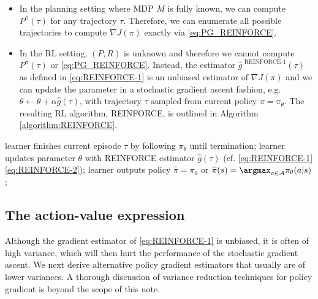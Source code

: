\begin{itemize}
    \item In the planning setting where MDP $M$ is fully known, we can compute $P^\pi(\tau)$ for any trajectory $\tau$.
    Therefore, we can enumerate all possible trajectories to compute $\nabla J(\pi)$ exactly via \eqref{eq:PG_REINFORCE}. 
    \item In the RL setting, $(P,R)$ is unknown and therefore we cannot compute $P^\pi(\tau)$ or \eqref{eq:PG_REINFORCE}.
    Instead, the estimator $\widehat{g}^{\text{ REINFORCE-1}}(\tau)$ as defined in \eqref{eq:REINFORCE-1} is an unbiased estimator of $\nabla J(\pi)$ and we can update the parameter in a stochastic gradient ascent fashion, e.g. $\theta \gets \theta + \alpha \widehat{g}(\tau)$, with trajectory $\tau$ sampled from current policy $\pi=\pi_\theta$.
    The resulting RL algorithm, REINFORCE, is outlined in Algorithm \ref{algorithm:REINFORCE}.
\end{itemize}
\begin{algorithm}
\caption{REINFORCE} \label{algorithm:REINFORCE}
\begin{algorithmic}[1]
    \State learner finishes current episode $\tau$ by following $\pi_\theta$ until termination; 
    \State learner updates parameter $\theta$ with REINFORCE estimator $\widehat{g}(\tau)$ (cf. \eqref{eq:REINFORCE-1} \eqref{eq:REINFORCE-2});
\State learner outputs policy $\widehat{\pi} =\pi_\theta$ or $\widehat{\pi}(s) =\argmax_{a\in\mathcal{A}}\pi_\theta(a|s)$;
\label{algorithm:RL interaction:line:final policy}
\end{algorithmic}
\end{algorithm}


\subsection{The action-value expression}
Although the gradient estimator of \eqref{eq:REINFORCE-1} is unbiased, it is often of high variance, which will then hurt the performance of the stochastic gradient ascent.
We next derive alternative policy gradient estimators that usually are of lower variances.
A thorough discussion of variance reduction techniques for policy gradient is beyond the scope of this note.

